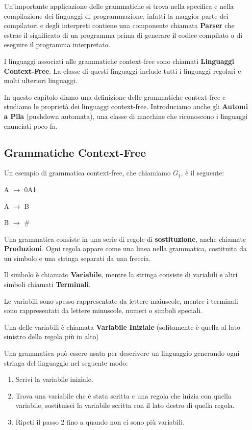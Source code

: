 \documentclass{article}
\begin{document}
Un'importante applicazione delle grammatiche si trova nella specifica e nella
compilazione dei linguaggi di programmazione, infatti la maggior parte dei
compilatori e degli interpreti contiene una componente chiamata \textbf{Parser}
che estrae il significato di un programma prima di generare il codice compilato
o di eseguire il programma interpretato.

I linguaggi associati alle grammatiche context-free sono chiamati
\textbf{Linguaggi Context-Free}. La classe di questi linguaggi include tutti i
linguaggi regolari e molti ulteriori linguaggi.

In questo capitolo diamo una definizione delle grammatiche context-free e
studiamo le proprietà dei linguaggi context-free. Introduciamo anche gli
\textbf{Automi a Pila} (pushdown automata), una classe di macchine che
riconoscono i linguaggi enunciati poco fa.

\subsection{Grammatiche Context-Free}

Un esempio di grammatica context-free, che chiamiamo $G_1$, è il seguente:

\begin{center}
    A $\rightarrow$ 0A1

    A $\rightarrow$ B

    B $\rightarrow$ \#
    
\end{center}

Una grammatica consiste in una serie di regole di \textbf{sostituzione}, anche
chiamate \textbf{Produzioni}. Ogni regola appare come una linea nella
grammatica, costituita da un simbolo e una stringa separati da una freccia.

Il simbolo è chiamato \textbf{Variabile}, mentre la stringa consiste di
variabili e altri simboli chiamati \textbf{Terminali}.

Le variabili sono spesso rappresentate da lettere maiuscole, mentre i terminali
sono rappresentati da lettere minuscole, numeri o simboli speciali.

Una delle variabili è chiamata \textbf{Variabile Iniziale} (solitamente è quella
al lato sinistro della regola più in alto)

Una grammatica può essere usata per descrivere un linguaggio generando ogni
stringa del linguaggio nel seguente modo:

\begin{enumerate}
    \item Scrivi la variabile iniziale.
    \item Trova una variabile che è stata scritta e una regola che inizia con
    quella variabile, sostituisci la variabile scritta con il lato destro di
    quella regola.
    \item Ripeti il passo 2 fino a quando non ci sono più variabili.
\end{enumerate}
\end{document}
